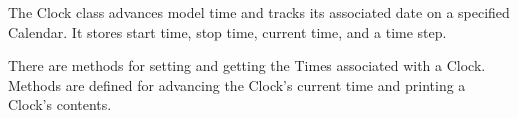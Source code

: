 
\label{sec:Clock}

The Clock class advances model time and tracks its associated 
date on a specified Calendar.  It stores start time, stop time, 
current time, and a time step. 

There are methods for setting and getting the Times associated 
with a Clock.  Methods are defined for advancing the Clock's 
current time and printing a Clock's contents.
